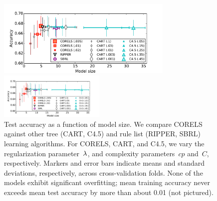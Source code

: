 \begin{figure}[t!]
\begin{center}
\begin{arxiv}
\includegraphics[width=0.75\textwidth]{figs/compas-sparsity.pdf}
\end{arxiv}
\begin{kdd}
\includegraphics[trim={10mm, 0mm, 20mm, 10mm}, width=0.45\textwidth]{figs/compas-sparsity.pdf}
\end{kdd}
\end{center}
\caption{Test accuracy as a function of model size.
%
We compare CORELS against other tree (CART, C4.5)
and rule list (RIPPER, SBRL) learning algorithms.
%
For CORELS, CART, and C4.5, we vary the regularization parameter~${\lambda}$,
and complexity parameters~$cp$ and~$C$, respectively.
%
Markers and error bars indicate means and standard deviations, respectively,
across cross-validation folds.
%
None of the models exhibit significant overfitting;
mean training accuracy never exceeds mean test accuracy
by more than about 0.01 (not pictured).
}
\label{fig:sparsity}
\end{figure}


